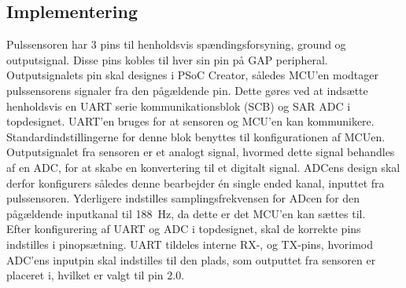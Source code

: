 {\subsection{Implementering}
Pulssensoren har 3 pins til henholdsvis spændingsforsyning, ground og outputsignal. Disse pins kobles til hver sin pin på GAP peripheral. Outputsignalets pin skal designes i PSoC Creator, således MCU'en modtager pulssensorens signaler fra den pågældende pin. Dette gøres ved at indsætte henholdsvis en UART serie kommunikationsblok (SCB) og SAR ADC i topdesignet. UART'en bruges for at sensoren og MCU'en kan kommunikere. Standardindstillingerne for denne blok benyttes til konfigurationen af MCUen. \newline
Outputsignalet fra sensoren er et analogt signal, hvormed dette signal behandles af en ADC, for at skabe en konvertering til et digitalt signal. ADCens design skal derfor konfigurers således denne bearbejder én single ended kanal, inputtet fra pulssensoren. Yderligere indstilles samplingsfrekvensen for ADcen for den pågældende inputkanal til 188~Hz, da dette er det MCU'en kan sættes til. \\
Efter konfigurering af UART og ADC i topdesignet, skal de korrekte pins indstilles i pinopsætning. UART tildeles interne RX-, og TX-pins, hvorimod ADC'ens inputpin skal indstilles til den plads, som outputtet fra sensoren er placeret i, hvilket er valgt til pin 2.0. 

}
